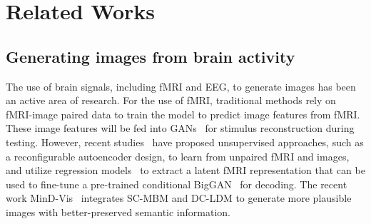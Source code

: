 \documentclass[10pt,twocolumn,letterpaper]{article}
\begin{document}






\section{Related Works}

\subsection{Generating images from brain activity}

The use of brain signals, including fMRI and EEG, to generate images has been an active area of research. For the use of fMRI, traditional methods rely on fMRI-image paired data to train the model to predict image features from fMRI. These image features will be fed into GANs~\cite{DBLP:journals/ficn/ShenDMHK19} for stimulus reconstruction during testing. However, recent studies~\cite{bird2014categorical} have proposed unsupervised approaches, such as a reconfigurable autoencoder design, to learn from unpaired fMRI and images, and utilize regression models~\cite{mozafari2020reconstructing,ozcelik2022reconstruction} to extract a latent fMRI representation that can be used to fine-tune a pre-trained conditional BigGAN~\cite{DBLP:conf/iclr/BrockDS19} for decoding. The recent work MinD-Vis~\cite{chen_2022_arXiv} integrates SC-MBM and DC-LDM to generate more plausible images with better-preserved semantic information.
\end{document}
